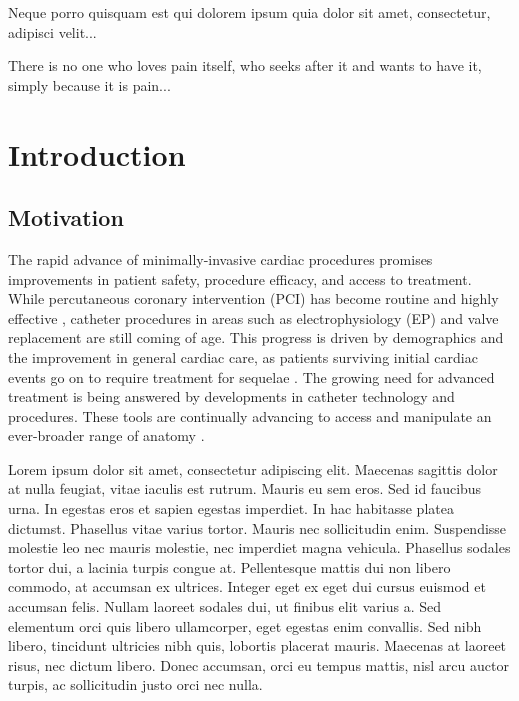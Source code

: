 \begin{savequote}[8cm]
\textlatin{Neque porro quisquam est qui dolorem ipsum quia dolor sit amet, consectetur, adipisci velit...}

There is no one who loves pain itself, who seeks after it and wants to have it, simply because it is pain...
\end{savequote}

\chapter{\label{ch:1-intro}Introduction} 

\minitoc

\section{Motivation}

The rapid advance of minimally-invasive cardiac procedures promises improvements in patient safety, procedure efficacy, and access to treatment.  While percutaneous coronary intervention (PCI) has become routine and highly effective \cite{bravata_systematic_2007}, catheter procedures in areas such as electrophysiology (EP) and valve replacement are still coming of age.  This progress is driven by demographics and the improvement in general cardiac care, as patients surviving initial cardiac events go on to require treatment for sequelae \cite{foot_demographics_2000}.  The growing need for advanced treatment is being answered by developments in catheter technology and procedures.  These tools are continually advancing to access and manipulate an ever-broader range of anatomy \cite{sousa_new_2005}.

Lorem ipsum dolor sit amet, consectetur adipiscing elit. Maecenas sagittis dolor at nulla feugiat, vitae iaculis est rutrum. Mauris eu sem eros. Sed id faucibus urna. In egestas eros et sapien egestas imperdiet. In hac habitasse platea dictumst. Phasellus vitae varius tortor. Mauris nec sollicitudin enim. Suspendisse molestie leo nec mauris molestie, nec imperdiet magna vehicula. Phasellus sodales tortor dui, a lacinia turpis congue at. Pellentesque mattis dui non libero commodo, at accumsan ex ultrices. Integer eget ex eget dui cursus euismod et accumsan felis. Nullam laoreet sodales dui, ut finibus elit varius a. Sed elementum orci quis libero ullamcorper, eget egestas enim convallis. Sed nibh libero, tincidunt ultricies nibh quis, lobortis placerat mauris. Maecenas at laoreet risus, nec dictum libero. Donec accumsan, orci eu tempus mattis, nisl arcu auctor turpis, ac sollicitudin justo orci nec nulla.

